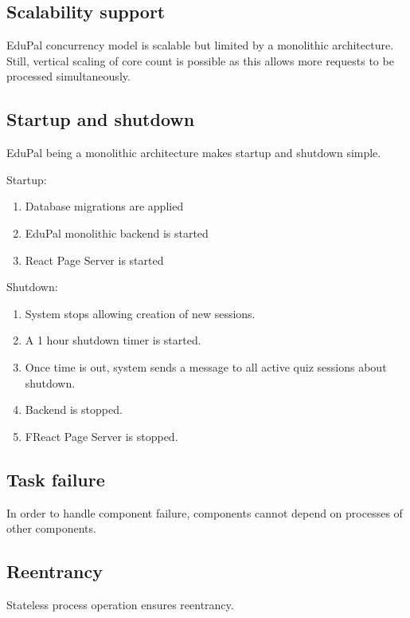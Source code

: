\subsection{Scalability support}

EduPal concurrency model is scalable but limited by a monolithic architecture. Still, vertical scaling of core count is possible as this allows more requests to be processed simultaneously.

\subsection{Startup and shutdown}

EduPal being a monolithic architecture makes startup and shutdown simple.

Startup:

\begin{enumerate}
  \item Database migrations are applied
  \item EduPal monolithic backend is started
  \item React Page Server is started
\end{enumerate}

Shutdown:

\begin{enumerate}
  \item System stops allowing creation of new sessions.
  \item A 1 hour shutdown timer is started.
  \item Once time is out, system sends a message to all active quiz sessions about shutdown.
  \item Backend is stopped.
  \item FReact Page Server is stopped.
\end{enumerate}

\subsection{Task failure}

In order to handle component failure, components cannot depend on processes of other components.

\subsection{Reentrancy}

Stateless process operation ensures reentrancy.

